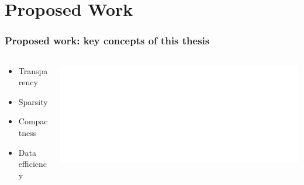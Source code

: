 \documentclass[xetex,aspectratio=169,xcolor,professionalfonts,hyperref]{beamer}
\begin{document}


\section{Proposed Work}

\begin{frame}
    \frametitle{Proposed work: key concepts of this thesis}
    \begin{columns}
        \begin{column}{0.55\columnwidth}
        \fontsize{12pt}{15}\selectfont%
        \vspace{-0.5cm}
        \begin{itemize}
            \item Transparency
            \item Sparsity
            \item Compactness
            \item Data efficiency
        \end{itemize}
        \bigskip
        \begin{itemize}
        \end{itemize}
        \end{column}

        \begin{column}{0.45\columnwidth}
        \begin{center}
            \includegraphics[width=0.95\columnwidth]{figures/alignments.pdf}
        \end{center}
        \end{column}
    \end{columns}
\end{frame}
\end{document}

